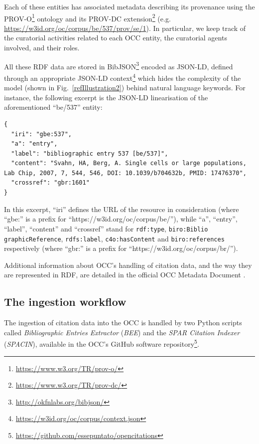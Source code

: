 \documentclass[runningheads,a4paper]{llncs}
\begin{document}
Each of these entities has associated metadata describing its provenance using the PROV-O\footnote{\url{https://www.w3.org/TR/prov-o/}} ontology and its PROV-DC extension\footnote{\url{https://www.w3.org/TR/prov-dc/}} (e.g. \url{https://w3id.org/oc/corpus/be/537/prov/se/1}). In particular, we keep track of the curatorial activities related to each OCC entity, the curatorial agents involved, and their roles. 

All these RDF data are stored in BibJSON\footnote{\url{http://okfnlabs.org/bibjson/}} encoded as JSON-LD, defined through an appropriate JSON-LD context\footnote{\url{https://w3id.org/oc/corpus/context.json}} which hides the complexity of the model (shown in Fig.~\ref{refIllustration2}) behind natural language keywords. For instance, the following excerpt is the JSON-LD linearisation of the aforementioned ``be/537'' entity:

\begin{lstlisting}[mathescape]
{
  "iri": "gbe:537", 
  "a": "entry", 
  "label": "bibliographic entry 537 [be/537]", 
  "content": "Svahn, HA, Berg, A. Single cells or large populations, Lab Chip, 2007, 7, 544, 546, DOI: 10.1039/b704632b, PMID: 17476370", 
  "crossref": "gbr:1601"
}
\end{lstlisting}

In this excerpt, ``iri'' defines the URL of the resource in consideration (where ``gbe:'' is a prefix for ``https://w3id.org/oc/corpus/be/''), while ``a'', ``entry'', ``label'', ``content'' and ``crossref'' stand for \Verb+rdf:type+, \Verb+biro:Biblio+ \Verb+graphicReference+, \Verb+rdfs:label+, \Verb+c4o:hasContent+ and \Verb+biro:references+ respectively (where ``gbr:'' is a prefix for ``https://w3id.org/oc/corpus/br/'').

Additional information about OCC's handling of citation data, and the way they are represented in RDF, are detailed in the official OCC Metadata Document  \cite{__RefNumPara__19_1852566440}.

\subsection{The ingestion workflow}

The ingestion of citation data into the OCC is handled by two Python scripts called {\em Bibliographic Entries Extractor} ({\em BEE}) and the {\em SPAR Citation Indexer} ({\em SPACIN}), available in the OCC's GitHub software repository\footnote{\url{https://github.com/essepuntato/opencitations}}.
\end{document}

